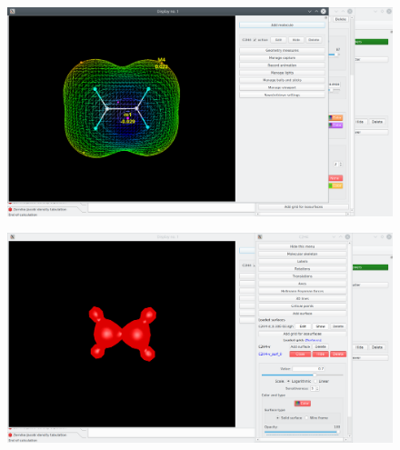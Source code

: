 \documentclass[a4paper,10pt]{article}
\begin{document}
\begin{minipage}{.5\linewidth}
\begin{figure}[H]
\caption{\label{fig:47}}
\begin{center}
\includegraphics[width=0.95\linewidth]{damqt_QS_fig47.png}
\end{center}
\end{figure} 
\end{minipage}
\begin{minipage}{.5\linewidth}
\begin{figure}[H]
\caption{\label{fig:48}}
\begin{center}
\includegraphics[width=0.95\linewidth]{damqt_QS_fig48.png}
\end{center}
\end{figure} 
\end{minipage}

\end{document}

